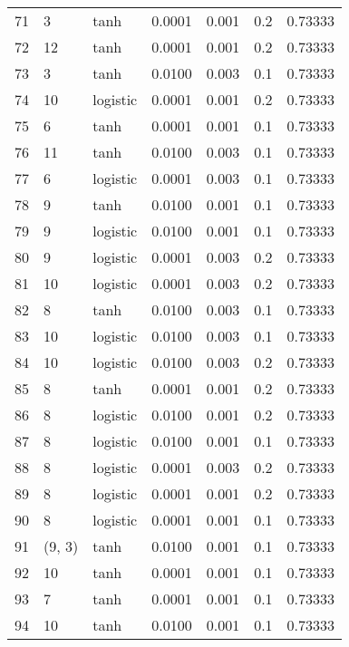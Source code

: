 \begin{tabular}{lllrrrr}
71  &           3 &      tanh &  0.0001 &  0.001 &  0.2 &   0.73333 \\
72  &          12 &      tanh &  0.0001 &  0.001 &  0.2 &   0.73333 \\
73  &           3 &      tanh &  0.0100 &  0.003 &  0.1 &   0.73333 \\
74  &          10 &  logistic &  0.0001 &  0.001 &  0.2 &   0.73333 \\
75  &           6 &      tanh &  0.0001 &  0.001 &  0.1 &   0.73333 \\
76  &          11 &      tanh &  0.0100 &  0.003 &  0.1 &   0.73333 \\
77  &           6 &  logistic &  0.0001 &  0.003 &  0.1 &   0.73333 \\
78  &           9 &      tanh &  0.0100 &  0.001 &  0.1 &   0.73333 \\
79  &           9 &  logistic &  0.0100 &  0.001 &  0.1 &   0.73333 \\
80  &           9 &  logistic &  0.0001 &  0.003 &  0.2 &   0.73333 \\
81  &          10 &  logistic &  0.0001 &  0.003 &  0.2 &   0.73333 \\
82  &           8 &      tanh &  0.0100 &  0.003 &  0.1 &   0.73333 \\
83  &          10 &  logistic &  0.0100 &  0.003 &  0.1 &   0.73333 \\
84  &          10 &  logistic &  0.0100 &  0.003 &  0.2 &   0.73333 \\
85  &           8 &      tanh &  0.0001 &  0.001 &  0.2 &   0.73333 \\
86  &           8 &  logistic &  0.0100 &  0.001 &  0.2 &   0.73333 \\
87  &           8 &  logistic &  0.0100 &  0.001 &  0.1 &   0.73333 \\
88  &           8 &  logistic &  0.0001 &  0.003 &  0.2 &   0.73333 \\
89  &           8 &  logistic &  0.0001 &  0.001 &  0.2 &   0.73333 \\
90  &           8 &  logistic &  0.0001 &  0.001 &  0.1 &   0.73333 \\
91  &      (9, 3) &      tanh &  0.0100 &  0.001 &  0.1 &   0.73333 \\
92  &          10 &      tanh &  0.0001 &  0.001 &  0.1 &   0.73333 \\
93  &           7 &      tanh &  0.0001 &  0.001 &  0.1 &   0.73333 \\
94  &          10 &      tanh &  0.0100 &  0.001 &  0.1 &   0.73333 \\

\end{tabular}
